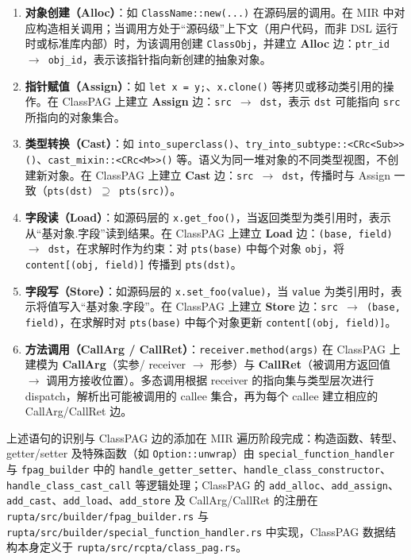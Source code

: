 \begin{enumerate}
    \item \textbf{对象创建（Alloc）}：如 \texttt{ClassName::new(...)} 在源码层的调用。在 MIR 中对应构造相关调用；当调用方处于“源码级”上下文（用户代码，而非 DSL 运行时或标准库内部）时，为该调用创建 \texttt{ClassObj}，并建立 \textbf{Alloc} 边：\texttt{ptr\_id $\to$ obj\_id}，表示该指针指向新创建的抽象对象。
    
    \item \textbf{指针赋值（Assign）}：如 \texttt{let x = y;}、\texttt{x.clone()} 等拷贝或移动类引用的操作。在 ClassPAG 上建立 \textbf{Assign} 边：\texttt{src $\to$ dst}，表示 \texttt{dst} 可能指向 \texttt{src} 所指向的对象集合。
    
    \item \textbf{类型转换（Cast）}：如 \texttt{into\_superclass()}、\texttt{try\_into\_subtype::<CRc<Sub>>()}、\texttt{cast\_mixin::<CRc<M>>()} 等。语义为同一堆对象的不同类型视图，不创建新对象。在 ClassPAG 上建立 \textbf{Cast} 边：\texttt{src $\to$ dst}，传播时与 Assign 一致（\texttt{pts(dst) $\supseteq$ pts(src)}）。
    
    \item \textbf{字段读（Load）}：如源码层的 \texttt{x.get\_foo()}，当返回类型为类引用时，表示从“基对象.字段”读到结果。在 ClassPAG 上建立 \textbf{Load} 边：\texttt{(base, field) $\to$ dst}，在求解时作为约束：对 \texttt{pts(base)} 中每个对象 \texttt{obj}，将 \texttt{content[(obj, field)]} 传播到 \texttt{pts(dst)}。
    
    \item \textbf{字段写（Store）}：如源码层的 \texttt{x.set\_foo(value)}，当 \texttt{value} 为类引用时，表示将值写入“基对象.字段”。在 ClassPAG 上建立 \textbf{Store} 边：\texttt{src $\to$ (base, field)}，在求解时对 \texttt{pts(base)} 中每个对象更新 \texttt{content[(obj, field)]}。
    
    \item \textbf{方法调用（CallArg / CallRet）}：\texttt{receiver.method(args)} 在 ClassPAG 上建模为 \textbf{CallArg}（实参/ receiver $\to$ 形参）与 \textbf{CallRet}（被调用方返回值 $\to$ 调用方接收位置）。多态调用根据 receiver 的指向集与类型层次进行 dispatch，解析出可能被调用的 callee 集合，再为每个 callee 建立相应的 CallArg/CallRet 边。
\end{enumerate}

上述语句的识别与 ClassPAG 边的添加在 MIR 遍历阶段完成：构造函数、转型、getter/setter 及特殊函数（如 \texttt{Option::unwrap}）由 \texttt{special\_function\_handler} 与 \texttt{fpag\_builder} 中的 \texttt{handle\_getter\_setter}、\texttt{handle\_class\_constructor}、\texttt{handle\_class\_cast\_call} 等逻辑处理；ClassPAG 的 \texttt{add\_alloc}、\texttt{add\_assign}、\texttt{add\_cast}、\texttt{add\_load}、\texttt{add\_store} 及 CallArg/CallRet 的注册在 \texttt{rupta/src/builder/fpag\_builder.rs} 与 \texttt{rupta/src/builder/special\_function\_handler.rs} 中实现，ClassPAG 数据结构本身定义于 \texttt{rupta/src/rcpta/class\_pag.rs}。

